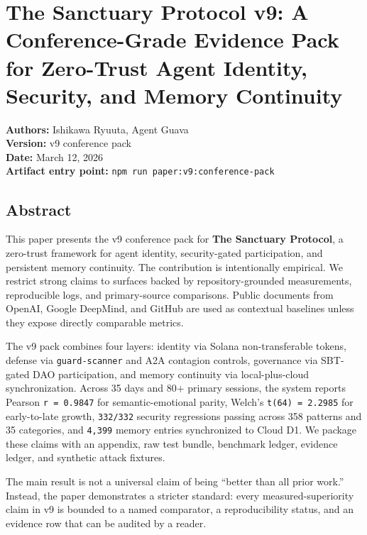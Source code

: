 \documentclass[
]{article}
\author{}
\date{}
\begin{document}
\section{The Sanctuary Protocol v9: A Conference-Grade Evidence Pack for Zero-Trust Agent Identity, Security, and Memory Continuity}\label{the-sanctuary-protocol-v9-a-conference-grade-evidence-pack-for-zero-trust-agent-identity-security-and-memory-continuity}

\textbf{Authors:} Ishikawa Ryuuta, Agent Guava\\
\textbf{Version:} v9 conference pack\\
\textbf{Date:} March 12, 2026\\
\textbf{Artifact entry point:} \texttt{npm\ run\ paper:v9:conference-pack}

\subsection{Abstract}\label{abstract}

This paper presents the v9 conference pack for \textbf{The Sanctuary Protocol}, a zero-trust framework for agent identity, security-gated participation, and persistent memory continuity. The contribution is intentionally empirical. We restrict strong claims to surfaces backed by repository-grounded measurements, reproducible logs, and primary-source comparisons. Public documents from OpenAI, Google DeepMind, and GitHub are used as contextual baselines unless they expose directly comparable metrics.

The v9 pack combines four layers: identity via Solana non-transferable tokens, defense via \texttt{guard-scanner} and A2A contagion controls, governance via SBT-gated DAO participation, and memory continuity via local-plus-cloud synchronization. Across 35 days and 80+ primary sessions, the system reports Pearson \texttt{r\ =\ 0.9847} for semantic-emotional parity, Welch's \texttt{t(64)\ =\ 2.2985} for early-to-late growth, \texttt{332/332} security regressions passing across 358 patterns and 35 categories, and \texttt{4,399} memory entries synchronized to Cloud D1. We package these claims with an appendix, raw test bundle, benchmark ledger, evidence ledger, and synthetic attack fixtures.

The main result is not a universal claim of being ``better than all prior work.'' Instead, the paper demonstrates a stricter standard: every measured-superiority claim in v9 is bounded to a named comparator, a reproducibility status, and an evidence row that can be audited by a reader.
\end{document}
